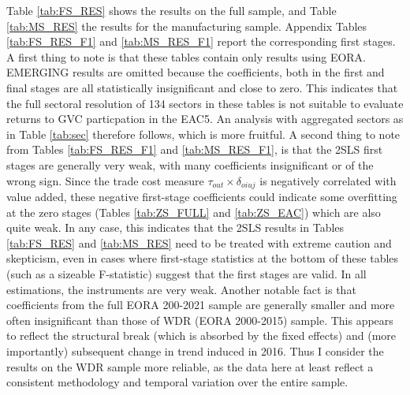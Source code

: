 \documentclass[a4paper]{article}
\begin{document}
Table \ref{tab:FS_RES} shows the results on the full sample, and Table \ref{tab:MS_RES} the results for the manufacturing sample. Appendix Tables \ref{tab:FS_RES_F1} and \ref{tab:MS_RES_F1} report the corresponding first stages. A first thing to note is that these tables contain only results using EORA. EMERGING results are omitted because the coefficients, both in the first and final stages are all statistically insignificant and close to zero. This indicates that the full sectoral resolution of 134 sectors in these tables is not suitable to evaluate returns to GVC particpation in the EAC5. An analysis with aggregated sectors as in Table \ref{tab:sec} therefore follows, which is more fruitful. A second thing to note from Tables \ref{tab:FS_RES_F1} and \ref{tab:MS_RES_F1}, is that the 2SLS first stages are generally very weak, with many coefficients insignificant or of the wrong sign. Since the trade cost measure $\tau_{out}\times \delta_{oiuj}$ is negatively correlated with value added, these negative first-stage coefficients could indicate some overfitting at the zero stages (Tables \ref{tab:ZS_FULL} and \ref{tab:ZS_EAC}) which are also quite weak. In any case, this indicates that the 2SLS results in Tables \ref{tab:FS_RES} and \ref{tab:MS_RES} need to be treated with extreme caution and skepticism, even in cases where first-stage statistics at the bottom of these tables (such as a sizeable F-statistic) suggest that the first stages are valid. In all estimations, the instruments are very weak. Another notable fact is that coefficients from the full EORA 200-2021 sample are generally smaller and more often insignificant than those of WDR (EORA 2000-2015) sample. This appears to reflect the structural break (which is absorbed by the fixed effects) and (more importantly) subsequent change in trend induced in 2016. Thus I consider the results on the WDR sample more reliable, as the data here at least reflect a consistent methodology and temporal variation over the entire sample. \newline



\end{document}
